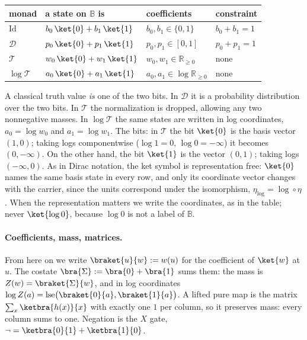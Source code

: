 \documentclass[anon]{../../journal-templates/NeSy26/nesy2026} %
\begin{document}
\begin{center}\small
\begin{tabular}{@{}llll@{}}
monad & a state on $\mathbb B$ is & coefficients & constraint \\
\midrule
$\mathrm{Id}$ & $b_0\,\ket{0} + b_1\,\ket{1}$ & $b_0, b_1 \in \{0,1\}$ & $b_0 + b_1 = 1$ \\[2pt]
$\mathcal D$ & $p_0\,\ket{0} + p_1\,\ket{1}$ & $p_0, p_1 \in [0,1]$ & $p_0 + p_1 = 1$ \\[2pt]
$\mathcal T$ & $w_0\,\ket{0} + w_1\,\ket{1}$ & $w_0, w_1 \in \mathbb R_{\ge 0}$ & none \\[2pt]
$\log\mathcal T$ & $a_0\,\ket{0} + a_1\,\ket{1}$ & $a_0, a_1 \in \log \mathbb R_{\ge 0}$ & none
\end{tabular}
\end{center}
\noindent
A classical truth value \emph{is} one of the two bits. In
$\mathcal D$ it is a probability distribution over the two bits. In
$\mathcal T$ the normalization is dropped, allowing any two nonnegative masses. In
$\log\mathcal T$ the same states are written in log coordinates,
$a_0 = \log w_0$ and $a_1 = \log w_1$. The bits: in $\mathcal T$ the bit
$\ket{0}$ is the basis vector $(1, 0)$; taking logs componentwise
($\log 1 = 0$, $\log 0 = -\infty$) it becomes $(0, -\infty)$. On the other hand, the bit $\ket{1}$ is the vector $(0, 1)$; taking logs $(-\infty, 0)$. As in Dirac
notation, the ket symbol is representation free: $\ket{0}$ names the
same basis state in every row, and only its coordinate vector changes
with the carrier, since the units correspond under the isomorphism,
$\eta_{\log} = \log \circ \eta$. When the representation matters we
write the coordinates, as in the table; never $\ket{\log 0}$, because
$\log 0$ is not a label of $\mathbb B$.


\paragraph{Coefficients, mass, matrices.} From here on we write
$\braket{u}{w} := w(u)$ for the coefficient of $\ket{w}$ at $u$. The costate
$\bra{\Sigma} := \bra{0} + \bra{1}$ sums them: the mass is
$Z(w) = \braket{\Sigma}{w}$, and in log coordinates
$\log Z(a) = \mathrm{lse}\bigl(\braket{0}{a}, \braket{1}{a}\bigr)$.
A lifted pure map is the matrix $\sum_x \ketbra{h(x)}{x}$ with
exactly one $1$ per column, so it preserves mass: every column sums to
one. Negation is the $X$ gate,
$\neg = \ketbra{0}{1} + \ketbra{1}{0}$.
\end{document}
